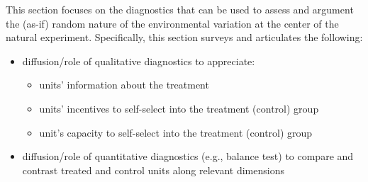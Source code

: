 This section focuses on the diagnostics that can be used to assess and
argument the (as-if) random nature of the environmental variation at the center
of the natural experiment. Specifically, this section surveys and articulates the
following:

%
%
%
%
%
%
%
%
%
%
%
%
%

\begin{itemize}
    \item diffusion/role of qualitative diagnostics to appreciate:
        \begin{itemize}
            \item units' information about the treatment
            \item units' incentives to self-select into the treatment (control)
                group
            \item unit's capacity to self-select into the treatment (control)
                group
        \end{itemize}
    \item diffusion/role of quantitative diagnostics (e.g., balance test) to 
        compare and contrast treated and control units along relevant dimensions
\end{itemize}